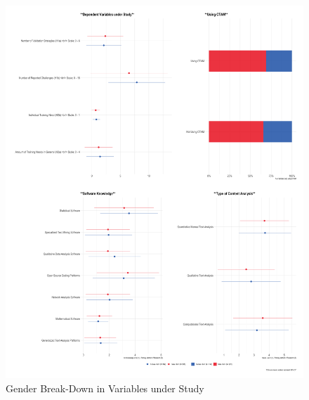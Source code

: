 \documentclass[
]{ccr}
\begin{document}
\begin{figure}[t]

{\centering \includegraphics[width=1\textwidth,height=\textheight]{figures/explorative-1.png}

}

\caption{\label{fig:descr}Gender Break-Down in Variables under Study}

\end{figure}
\end{document}
